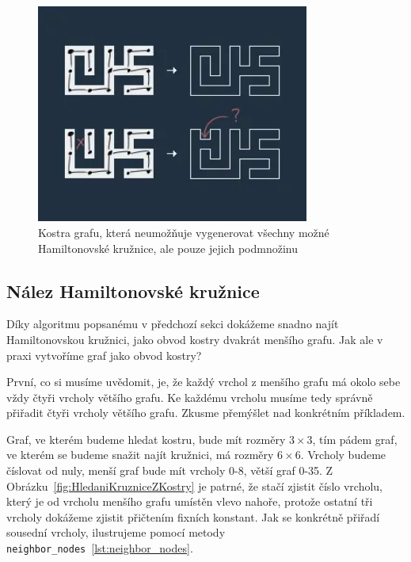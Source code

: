 \begin{figure}[!t]
    \centering
    \includegraphics[width = 0.8\textwidth]{Images/NotAllGenerations.png}
    \caption[Dostupné z: \url{https://miro.medium.com/v2/resize:fit:600/format:webp/1*P8932ZvcHs8vOl3OXzJCnA.png}]{Kostra grafu, která neumožňuje vygenerovat všechny možné Hamiltonovské kružnice, ale pouze jejich podmnožinu}
    \label{fig:NotAllGenerations}
\end{figure}

\subsection{Nález Hamiltonovské kružnice}

Díky algoritmu popsanému v předchozí sekci dokážeme snadno najít Hamiltonovskou kružnici, jako obvod kostry dvakrát menšího grafu. Jak ale v praxi vytvoříme graf jako obvod kostry? 

První, co si musíme uvědomit, je, že každý vrchol z menšího grafu má okolo sebe vždy čtyři vrcholy většího grafu. Ke každému vrcholu musíme tedy správně přiřadit čtyři vrcholy většího grafu. Zkusme přemýšlet nad konkrétním příkladem.

Graf, ve kterém budeme hledat kostru, bude mít rozměry \(3 \times 3\), tím pádem graf, ve kterém se budeme snažit najít kružnici, má rozměry \(6 \times 6\). Vrcholy budeme číslovat od nuly, menší graf bude mít vrcholy 0-8, větší graf 0-35. Z Obrázku~\ref{fig:HledaniKruzniceZKostry} je patrné, že stačí zjistit číslo vrcholu, který je od vrcholu menšího grafu umístěn vlevo nahoře, protože ostatní tři vrcholy dokážeme zjistit přičtením fixních konstant. Jak se konkrétně přiřadí sousední vrcholy, ilustrujeme pomocí metody \texttt{neighbor\_nodes}~\ref{lst:neighbor_nodes}. 

